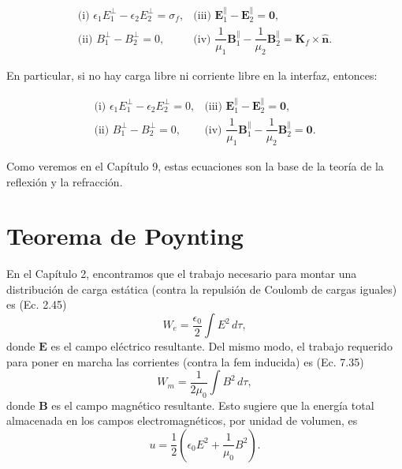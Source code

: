 \documentclass[12pt,a4paper]{report}
\newcommand{\esp}{\vspace{0.5cm}}
\begin{document}
	\begin{equation}
		\begin{array}{ll}
			\text{(i) } \epsilon_1 E_1^{\perp} - \epsilon_2 E_2^{\perp} = \sigma_f, & \text{(iii) } \mathbf{E}_1^{\parallel} - \mathbf{E}_2^{\parallel} = \mathbf{0}, \\
			\text{(ii) } B_1^{\perp} - B_2^{\perp} = 0, & \text{(iv) } \dfrac{1}{\mu_1} \mathbf{B}_1^{\parallel} - \dfrac{1}{\mu_2} \mathbf{B}_2^{\parallel} = \mathbf{K}_f \times \hat{\mathbf{n}}.
		\end{array} \tag{7.64}
	\end{equation}
	
	En particular, si no hay carga libre ni corriente libre en la interfaz, entonces:
	
	\begin{equation}
		\begin{array}{ll}
			\text{(i) } \epsilon_1 E_1^{\perp} - \epsilon_2 E_2^{\perp} = 0, & \text{(iii) } \mathbf{E}_1^{\parallel} - \mathbf{E}_2^{\parallel} = \mathbf{0}, \\
			\text{(ii) } B_1^{\perp} - B_2^{\perp} = 0, & \text{(iv) } \dfrac{1}{\mu_1} \mathbf{B}_1^{\parallel} - \dfrac{1}{\mu_2} \mathbf{B}_2^{\parallel} = \mathbf{0}.
		\end{array} \tag{7.65}
	\end{equation}
	
	Como veremos en el Capítulo 9, estas ecuaciones son la base de la teoría de la reflexión y la refracción.
	
	\esp
	
	\section{Teorema de Poynting}
	
	En el Capítulo 2, encontramos que el trabajo necesario para montar una distribución de carga estática (contra la repulsión de Coulomb de cargas iguales) es (Ec. 2.45)
	\begin{equation*}
		W_e = \frac{\epsilon_0}{2} \int E^2 \, d\tau,
	\end{equation*}
	donde $\mathbf{E}$ es el campo eléctrico resultante. Del mismo modo, el trabajo requerido para poner en marcha las corrientes (contra la fem inducida) es (Ec. 7.35)
	\begin{equation*}
		W_m = \frac{1}{2\mu_0} \int B^2 \, d\tau,
	\end{equation*}
	donde $\mathbf{B}$ es el campo magnético resultante. Esto sugiere que la energía total almacenada en los campos electromagnéticos, por unidad de volumen, es
	\begin{equation}
		u = \frac{1}{2} \left( \epsilon_0 E^2 + \frac{1}{\mu_0} B^2 \right). \tag{8.5}
	\end{equation}
	
\end{document}

